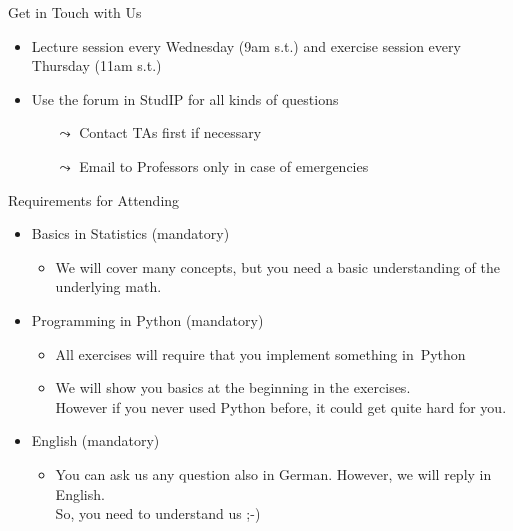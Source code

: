 \documentclass[aspectratio=169]{../latex_main/tntbeamer}  %
\begin{document}
\begin{frame}[c]{Get in Touch with Us}

\begin{itemize}
  \item Lecture session every Wednesday (9am s.t.) and exercise session every Thursday (11am s.t.)
  \item \alert{Use the forum in StudIP for all kinds of questions}
  \begin{itemize}
        \item[$\leadsto$] Contact TAs first if necessary 
      \item[$\leadsto$] Email to Professors only in case of emergencies
  \end{itemize}
\end{itemize}

\end{frame}
\begin{frame}[c]{Requirements for Attending}

\begin{itemize}
    \item Basics in \alert{Statistics} (mandatory)
    \begin{itemize}
        \item We will cover many concepts, but you need a basic understanding of the underlying math.
    \end{itemize}
  \item Programming in \alert{Python} (mandatory)
  \begin{itemize}
    \item All exercises will require that you implement something in~Python 
    \item We will show you basics at the beginning in the exercises.\\ However if you never used Python before, it could get quite hard for you.
  \end{itemize}
  \item \alert{English} (mandatory)
    \begin{itemize}
    \item You can ask us any question also in German. However, we will reply in English.\\ So, you need to understand us ;-)
  \end{itemize}
\end{itemize}

\end{frame}
\end{document}
